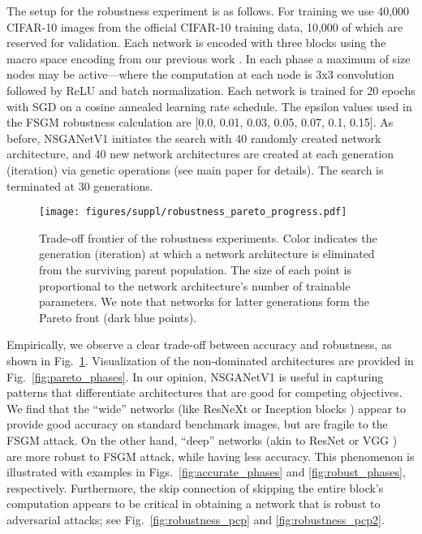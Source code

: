 \documentclass[journal]{IEEEtran}
\def\ourmethod{NSGANetV1}
\theoremstyle{definition}
\theoremstyle{remark}
\begin{document}
The setup for the robustness experiment is as follows. For training we use 40,000 CIFAR-10 images from the official CIFAR-10 training data, 10,000 of which are reserved for validation. Each network is encoded with three blocks using the macro space encoding from our previous work \cite{lu2019nsga}. In each phase a maximum of size nodes may be active---where the computation at each node is 3x3 convolution followed by ReLU and batch normalization. Each network is trained for 20 epochs with SGD on a cosine annealed learning rate schedule. The epsilon values used in the FSGM robustness calculation are [0.0, 0.01, 0.03, 0.05, 0.07, 0.1, 0.15]. As before, \ourmethod{} initiates the search with 40 randomly created network architecture, and 40 new network architectures are created at each generation (iteration) via genetic operations (see main paper for details). The search is terminated at 30 generations.

\begin{figure}[hbt]
    \centering
    \texttt{[image: figures/suppl/robustness\_pareto\_progress.pdf]}
    \caption{Trade-off frontier of the robustness experiments. Color indicates the generation (iteration) at which a network architecture is eliminated from the surviving parent population. The size of each point is proportional to the network architecture's number of trainable parameters. We note that networks for latter generations form the Pareto front (dark blue points).}
    \label{fig:robustness_pareto_progress}
\end{figure}

Empirically, we observe a clear trade-off between accuracy and robustness, as shown in Fig.~\ref{fig:robustness_pareto_progress}. Visualization of the non-dominated architectures are provided in Fig.~\ref{fig:pareto_phases}. In our opinion, \ourmethod{} is useful in capturing patterns that differentiate architectures that are good for competing objectives. We find that the ``wide'' networks (like ResNeXt \cite{xie2017aggregated} or Inception blocks \cite{googlenet}) appear to provide good accuracy on standard benchmark images, but are fragile to the FSGM attack. On the other hand, ``deep'' networks (akin to ResNet \cite{resnet} or VGG \cite{vgg}) are more robust to FSGM attack, while having less accuracy. This phenomenon is illustrated with examples in Figs.~\ref{fig:accurate_phases} and \ref{fig:robust_phases}, respectively. Furthermore, the skip connection of skipping the entire block's computation appears to be critical in obtaining a network that is robust to adversarial attacks; see Fig.~\ref{fig:robustness_pcp} and \ref{fig:robustness_pcp2}.
\end{document}
